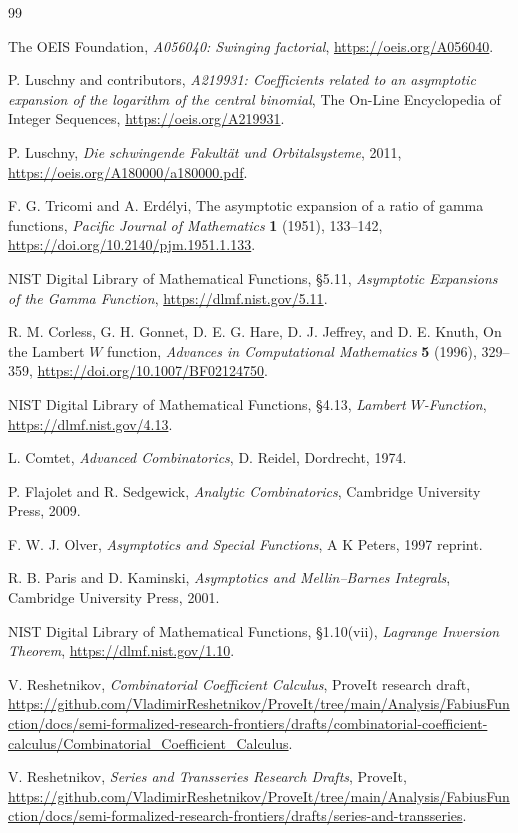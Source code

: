 \documentclass[11pt,a4paper]{article}
\numberwithin{equation}{section}
\theoremstyle{definition}
\theoremstyle{remark}
\begin{document}
\begin{thebibliography}{99}

The OEIS Foundation,
\emph{A056040: Swinging factorial},
\url{https://oeis.org/A056040}.

P. Luschny and contributors,
\emph{A219931: Coefficients related to an asymptotic expansion of the
logarithm of the central binomial},
The On-Line Encyclopedia of Integer Sequences,
\url{https://oeis.org/A219931}.

P. Luschny,
\emph{Die schwingende Fakult\"at und Orbitalsysteme}, 2011,
\url{https://oeis.org/A180000/a180000.pdf}.

F. G. Tricomi and A. Erd\'elyi,
The asymptotic expansion of a ratio of gamma functions,
\emph{Pacific Journal of Mathematics} \textbf{1} (1951), 133--142,
\url{https://doi.org/10.2140/pjm.1951.1.133}.

NIST Digital Library of Mathematical Functions,
\S5.11, \emph{Asymptotic Expansions of the Gamma Function},
\url{https://dlmf.nist.gov/5.11}.

R. M. Corless, G. H. Gonnet, D. E. G. Hare, D. J. Jeffrey, and D. E. Knuth,
On the Lambert \(W\) function,
\emph{Advances in Computational Mathematics} \textbf{5} (1996), 329--359,
\url{https://doi.org/10.1007/BF02124750}.

NIST Digital Library of Mathematical Functions,
\S4.13, \emph{Lambert \(W\)-Function},
\url{https://dlmf.nist.gov/4.13}.

L. Comtet,
\emph{Advanced Combinatorics},
D. Reidel, Dordrecht, 1974.

P. Flajolet and R. Sedgewick,
\emph{Analytic Combinatorics},
Cambridge University Press, 2009.

F. W. J. Olver,
\emph{Asymptotics and Special Functions},
A K Peters, 1997 reprint.

R. B. Paris and D. Kaminski,
\emph{Asymptotics and Mellin--Barnes Integrals},
Cambridge University Press, 2001.

NIST Digital Library of Mathematical Functions,
\S1.10(vii), \emph{Lagrange Inversion Theorem},
\url{https://dlmf.nist.gov/1.10}.

V. Reshetnikov,
\emph{Combinatorial Coefficient Calculus}, ProveIt research draft,
\url{https://github.com/VladimirReshetnikov/ProveIt/tree/main/Analysis/FabiusFunction/docs/semi-formalized-research-frontiers/drafts/combinatorial-coefficient-calculus/Combinatorial_Coefficient_Calculus}.

V. Reshetnikov,
\emph{Series and Transseries Research Drafts}, ProveIt,
\url{https://github.com/VladimirReshetnikov/ProveIt/tree/main/Analysis/FabiusFunction/docs/semi-formalized-research-frontiers/drafts/series-and-transseries}.

\end{thebibliography}
\end{document}
